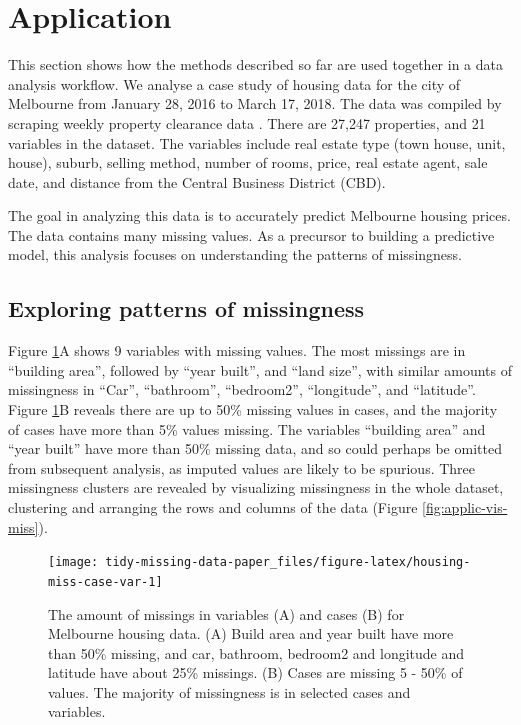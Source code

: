\documentclass[
]{jss}
\begin{document}
\hypertarget{case-study}{%
\section{Application}\label{case-study}}

This section shows how the methods described so far are used together in a data analysis workflow. We analyse a case study of housing data for the city of Melbourne from January 28, 2016 to March 17, 2018. The data was compiled by scraping weekly property clearance data \citep{Kaggle-2018-data}. There are 27,247 properties, and 21 variables in the dataset. The variables include real estate type (town house, unit, house), suburb, selling method, number of rooms, price, real estate agent, sale date, and distance from the Central Business District (CBD).

The goal in analyzing this data is to accurately predict Melbourne housing prices. The data contains many missing values. As a precursor to building a predictive model, this analysis focuses on understanding the patterns of missingness.

\hypertarget{case-study-explore-pattern}{%
\subsection{Exploring patterns of missingness}\label{case-study-explore-pattern}}

Figure \ref{fig:housing-miss-case-var}A shows 9 variables with missing values. The most missings are in ``building area'', followed by ``year built'', and ``land size'', with similar amounts of missingness in ``Car'', ``bathroom'', ``bedroom2'', ``longitude'', and ``latitude''. Figure \ref{fig:housing-miss-case-var}B reveals there are up to 50\% missing values in cases, and the majority of cases have more than 5\% values missing. The variables ``building area'' and ``year built'' have more than 50\% missing data, and so could perhaps be omitted from subsequent analysis, as imputed values are likely to be spurious. Three missingness clusters are revealed by visualizing missingness in the whole dataset, clustering and arranging the rows and columns of the data (Figure \ref{fig:applic-vis-miss}).

\begin{CodeChunk}
\begin{figure}

{\centering \texttt{[image: tidy-missing-data-paper\_files/figure-latex/housing-miss-case-var-1]} 

}

\caption[The amount of missings in variables (A) and cases (B) for Melbourne housing data]{The amount of missings in variables (A) and cases (B) for Melbourne housing data. (A) Build area and year built have more than 50\% missing, and car, bathroom, bedroom2 and longitude and latitude have about 25\% missings. (B) Cases are missing 5 - 50\% of values. The majority of missingness is in selected cases and variables.}\label{fig:housing-miss-case-var}
\end{figure}
\end{CodeChunk}
\end{document}

